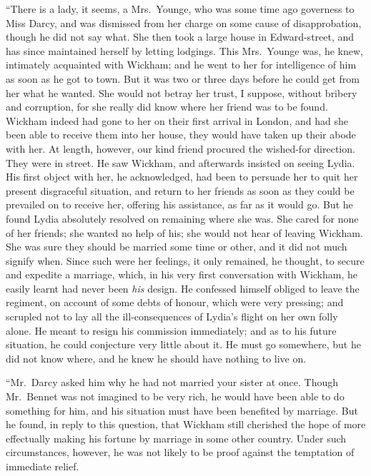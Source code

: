 ``There is a lady, it seems, a Mrs.\ Younge, who was some time ago
governess to Miss Darcy, and was dismissed from her charge on some
cause of disapprobation, though he did not say what.  She then took a
large house in Edward-street, and has since maintained herself by
letting lodgings.  This Mrs.\ Younge was, he knew, intimately
acquainted with Wickham; and he went to her for intelligence of him as
soon as he got to town.  But it was two or three days before he could
get from her what he wanted.  She would not betray her trust, I
suppose, without bribery and corruption, for she really did know where
her friend was to be found.  Wickham indeed had gone to her on their
first arrival in London, and had she been able to receive them into
her house, they would have taken up their abode with her.  At length,
however, our kind friend procured the wished-for direction.  They were
in \gdash{} street.  He saw Wickham, and afterwards insisted on seeing
Lydia.  His first object with her, he acknowledged, had been to
persuade her to quit her present disgraceful situation, and return to
her friends as soon as they could be prevailed on to receive her,
offering his assistance, as far as it would go.  But he found Lydia
absolutely resolved on remaining where she was.  She cared for none of
her friends; she wanted no help of his; she would not hear of leaving
Wickham.  She was sure they should be married some time or other, and
it did not much signify when.  Since such were her feelings, it only
remained, he thought, to secure and expedite a marriage, which, in his
very first conversation with Wickham, he easily learnt had never been
\emph{his} design.  He confessed himself obliged to leave the regiment, on
account of some debts of honour, which were very pressing; and
scrupled not to lay all the ill-consequences of Lydia's flight on her
own folly alone.  He meant to resign his commission immediately; and
as to his future situation, he could conjecture very little about it.
He must go somewhere, but he did not know where, and he knew he should
have nothing to live on.

``Mr.\ Darcy asked him why he had not married your sister at once.
Though Mr.\ Bennet was not imagined to be very rich, he would have been
able to do something for him, and his situation must have been
benefited by marriage.  But he found, in reply to this question, that
Wickham still cherished the hope of more effectually making his
fortune by marriage in some other country.  Under such circumstances,
however, he was not likely to be proof against the temptation of
immediate relief.

